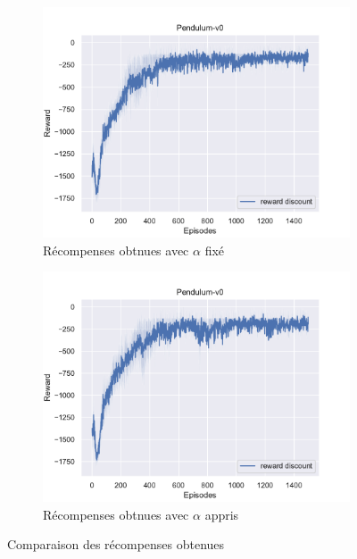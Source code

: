 \begin{figure}[H]
    \centering
    \begin{subfigure}{0.45\textwidth}
        \includegraphics[width=\textwidth]{figures/sac_itr4/a_fixed/rewards_Pendulum-v0_pg_dataset_td_trajs_1500_update_threshold_1000_nb_updates_20_gamma_0.98_tau_0.01_nstep_5_lr_act_0.0005_lr_critic_0.001_init_alpha_0.02_lr_alpha_0.0_target_entropy_alpha_-1.0.pdf}
        \caption{Récompenses obtnues avec \(\alpha\) fixé}
    \end{subfigure}
    \begin{subfigure}{0.45\textwidth}
        \includegraphics[width=\textwidth]{figures/sac_itr4/a_learned/rewards_Pendulum-v0_pg_dataset_td_trajs_1500_update_threshold_1000_nb_updates_20_gamma_0.98_tau_0.01_nstep_5_lr_act_0.0005_lr_critic_0.001_init_alpha_0.02_lr_alpha_0.001_target_entropy_alpha_-1.0.pdf}
        \caption{Récompenses obtnues avec \(\alpha\) appris}
    \end{subfigure}
    \caption{Comparaison des récompenses obtenues}\label{fig:sac:rewards4}
\end{figure}

